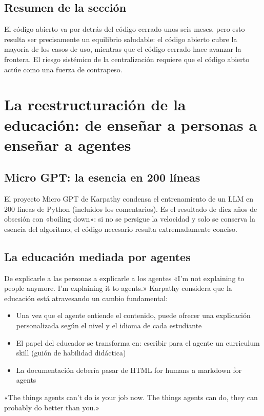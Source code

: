 \documentclass[a4paper]{article}
\begin{document}
\subsection{Resumen de la sección}

El código abierto va por detrás del código cerrado unos seis meses, pero esto resulta ser precisamente un equilibrio saludable: el código abierto cubre la mayoría de los casos de uso, mientras que el código cerrado hace avanzar la frontera. El riesgo sistémico de la centralización requiere que el código abierto actúe como una fuerza de contrapeso.

\section{La reestructuración de la educación: de enseñar a personas a enseñar a agentes}

\subsection{Micro GPT: la esencia en 200 líneas}

El proyecto Micro GPT de Karpathy condensa el entrenamiento de un LLM en 200 líneas de Python (incluidos los comentarios). Es el resultado de diez años de obsesión con «boiling down»: si no se persigue la velocidad y solo se conserva la esencia del algoritmo, el código necesario resulta extremadamente conciso.

\subsection{La educación mediada por agentes}

\begin{importantbox}{De explicarle a las personas a explicarle a los agentes}
«I'm not explaining to people anymore. I'm explaining it to agents.» Karpathy considera que la educación está atravesando un cambio fundamental:
\begin{itemize}
    \item Una vez que el agente entiende el contenido, puede ofrecer una explicación personalizada según el nivel y el idioma de cada estudiante
    \item El papel del educador se transforma en: escribir para el agente un curriculum skill (guión de habilidad didáctica)
    \item La documentación debería pasar de HTML for humans a markdown for agents
\end{itemize}
«The things agents can't do is your job now. The things agents can do, they can probably do better than you.»
\end{importantbox}
\end{document}
